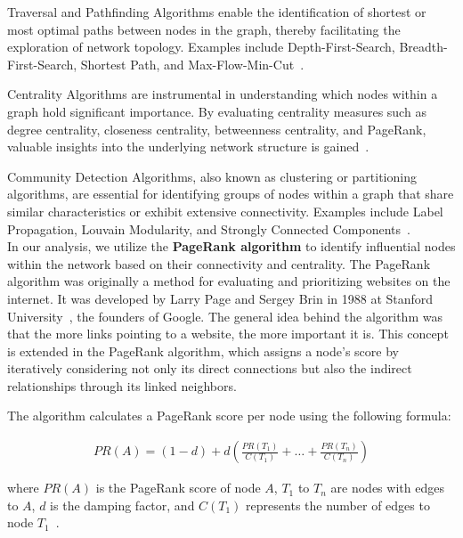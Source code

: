 Traversal and Pathfinding Algorithms enable the identification of shortest or
most optimal paths between nodes in the graph, thereby facilitating the exploration of network topology.
Examples include Depth-First-Search, Breadth-First-Search, Shortest Path, and Max-Flow-Min-Cut~\cite{neo4j_graph_algorithms}.

Centrality Algorithms are instrumental in understanding which nodes within a graph hold significant importance.
By evaluating centrality measures such as degree centrality, closeness centrality, betweenness centrality,
and PageRank, valuable insights into the underlying network structure is gained~\cite{neo4j_graph_algorithms}.

Community Detection Algorithms, also known as clustering or partitioning algorithms,
are essential for identifying groups of nodes within a graph that share similar characteristics
or exhibit extensive connectivity.
Examples include Label Propagation, Louvain Modularity, and Strongly Connected Components~\cite{neo4j_graph_algorithms}.
\\


In our analysis, we utilize the \textbf{PageRank algorithm} to identify influential nodes within the network
based on their connectivity and centrality.
The PageRank algorithm was originally a method for evaluating and prioritizing websites on the internet.
It was developed by Larry Page and Sergey Brin in 1988 at Stanford University~\cite{page1999pagerank},
the founders of Google.
The general idea behind the algorithm was that the more links pointing to a website, the more important it is.
This concept is extended in the PageRank algorithm, which assigns a node's score by iteratively considering not only its direct connections
but also the indirect relationships through its linked neighbors.

The algorithm calculates a PageRank score per node using the following formula:

\begin{align*}
PR(A)=(1-d)+d(\frac{PR(T_1)}{C(T_1)}+\dots+\frac{PR(T_n)}{C(T_n)})
\end{align*}

where $PR(A)$ is the PageRank score of node $A$,
$T_1$ to $T_n$ are nodes with edges to $A$,
$d$ is the damping factor,
and $C(T_1)$ represents the number of edges to node $T_1$~\cite{neo4j_graph_algorithms}.
